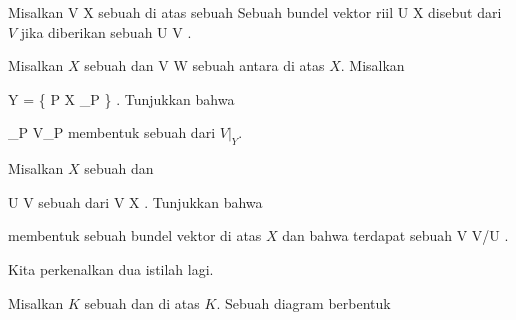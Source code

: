 Misalkan
\maabb {} { V } { X
} {}
sebuah
di atas sebuah
Sebuah bundel vektor riil
\maabb {} { U } { X
} {}
disebut
dari $V$ jika diberikan sebuah
\maabb {} { U } { V
} {}.

{}
{

Misalkan $X$ sebuah
dan
\maabb {\varphi} { V } { W
} {}
sebuah
antara
di atas $X$. Misalkan

\mavergleichskettedisp
{\vergleichskette
{ Y
}
{ =} { \left\{ P \in X  \mid  \varphi_P          \right\}
}
{ } {
}
{ } {
}
{ } {
}
}
{}{}{}.
Tunjukkan bahwa
 {} {}

\mavergleichskette
{\vergleichskette
{  \varphi_P
}
{ \subseteq }{ V_P
}
{  }{
}
{    }{
}
{   }{
}
}
{}{}{}
membentuk sebuah
dari $V\vert_Y$.

}
{} {}

{}
{

Misalkan $X$ sebuah
dan

\mavergleichskette
{\vergleichskette
{ U
}
{ \subseteq }{ V
}
{  }{
}
{    }{
}
{   }{
}
}
{}{}{}
sebuah
dari
\maabb {} { V } { X
} {.}
Tunjukkan bahwa
 {} {}

 membentuk sebuah bundel vektor di atas $X$ dan bahwa terdapat sebuah
\maabb {} { V } { V/U
} {}.

}
{} {}

Kita perkenalkan dua istilah lagi.

Misalkan $K$ sebuah
dan
di atas $K$. Sebuah diagram berbentuk

 {  }

